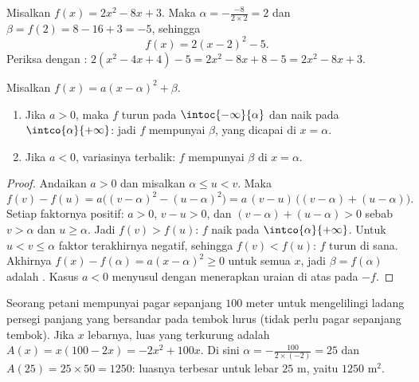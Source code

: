 \begin{example}\label{ex:g11:quad:canonical}
Misalkan $f(x) = 2x^2 - 8x + 3$. Maka $\alpha = -\frac{-8}{2 \times 2} = 2$ dan
$\beta = f(2) = 8 - 16 + 3 = -5$, sehingga
\[
f(x) = 2(x - 2)^2 - 5 .
\]
Periksa dengan : $2(x^2 - 4x + 4) - 5 = 2x^2 - 8x + 8 - 5 =
2x^2 - 8x + 3$.
\end{example}

\begin{proposition}\label{prop:g11:quad:variations}
Misalkan $f(x) = a(x-\alpha)^2 + \beta$.
\begin{enumerate}
  \item Jika $a > 0$, maka $f$ turun pada $\intoc{-\infty}{\alpha}$ dan
        naik pada $\intco{\alpha}{+\infty}$: jadi $f$ mempunyai \emph{}
        $\beta$, yang dicapai di $x = \alpha$.
  \item Jika $a < 0$, variasinya terbalik: $f$ mempunyai \emph{}
        $\beta$ di $x = \alpha$.
\end{enumerate}
\end{proposition}

\begin{proof}
Andaikan $a > 0$ dan misalkan $\alpha \leq u < v$. Maka
\[
f(v) - f(u) = a\bigl((v-\alpha)^2 - (u-\alpha)^2\bigr)
= a\,(v - u)\,\bigl((v-\alpha) + (u-\alpha)\bigr).
\]
Setiap faktornya positif: $a > 0$, $v - u > 0$, dan
$(v-\alpha) + (u-\alpha) > 0$ sebab $v > \alpha$ dan $u \geq \alpha$. Jadi
$f(v) > f(u)$: $f$ naik pada $\intco{\alpha}{+\infty}$. Untuk
$u < v \leq \alpha$ faktor terakhirnya negatif, sehingga $f(v) < f(u)$: $f$
turun di sana. Akhirnya $f(x) - f(\alpha) = a(x-\alpha)^2 \geq 0$ untuk semua
$x$, jadi $\beta = f(\alpha)$ adalah . Kasus $a < 0$ menyusul dengan
menerapkan uraian di atas pada $-f$.
\end{proof}

\begin{example}
Seorang petani mempunyai pagar sepanjang $100$ meter untuk mengelilingi ladang
persegi panjang yang bersandar pada tembok lurus (tidak perlu pagar sepanjang
tembok). Jika $x$ lebarnya, luas yang terkurung adalah
$A(x) = x(100 - 2x) = -2x^2 + 100x$. Di sini $\alpha =
-\frac{100}{2\times(-2)} = 25$ dan $A(25) = 25 \times 50 = 1250$: luasnya
terbesar untuk lebar $25$ m, yaitu $1250$ m$^2$.
\end{example}

